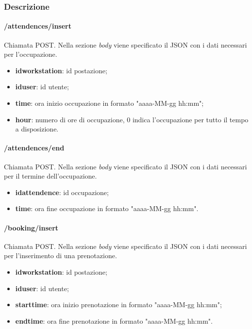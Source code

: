 \subsubsection{Descrizione}
\paragraph{/attendences/insert}
Chiamata POST. Nella sezione \textit{body} viene specificato il JSON con i dati necessari per l'occupazione.
\begin{itemize}
	\item \textbf{idworkstation}: id postazione;
	\item \textbf{iduser}: id utente;
	\item \textbf{time}: ora inizio occupazione in formato "aaaa-MM-gg hh:mm";
	\item \textbf{hour}: numero di ore di occupazione, 0 indica l'occupazione per tutto il tempo a disposizione.
\end{itemize}
\paragraph{/attendences/end}
Chiamata POST. Nella sezione \textit{body} viene specificato il JSON con i dati necessari per il termine dell'occupazione.
\begin{itemize}
	\item \textbf{idattendence}: id occupazione;
	\item \textbf{time}: ora fine occupazione in formato "aaaa-MM-gg hh:mm".
\end{itemize}
\paragraph{/booking/insert}
Chiamata POST. Nella sezione \textit{body} viene specificato il JSON con i dati necessari per l'inserimento di una prenotazione.
\begin{itemize}
	\item \textbf{idworkstation}: id postazione;
	\item \textbf{iduser}: id utente;
	\item \textbf{starttime}: ora inizio prenotazione in formato "aaaa-MM-gg hh:mm";
	\item \textbf{endtime}: ora fine prenotazione in formato "aaaa-MM-gg hh:mm".
\end{itemize}
